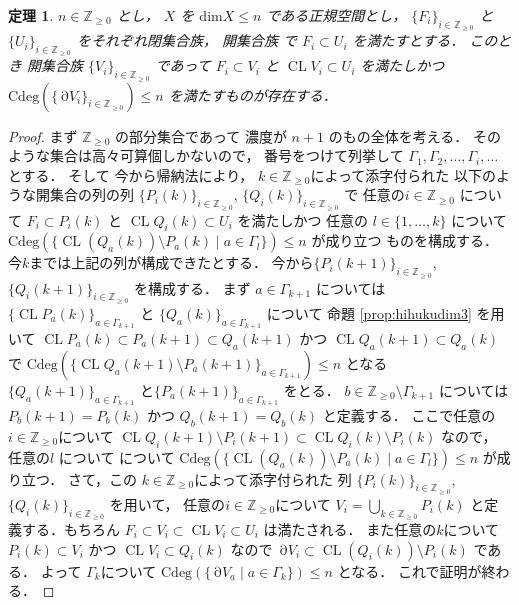 \documentclass[leqno, a4paper, 12pt]{jsarticle}
\newtheorem{thm}{定理}
\newcommand{\zz}{\mathbb{Z}}
\DeclareMathOperator{\bd}{\partial}
\DeclareMathOperator{\cl}{CL}
\newcommand{\yodim}{\mathrm{dim}}
\newcommand{\yodeg}{\mathrm{Cdeg}}
\numberwithin{equation}{section}
\begin{document}
\begin{thm}\label{thm:countablefam}
$n\in \zz_{\ge 0}$
とし，
$X$
を
$\yodim X\le n$
である正規空間とし，
$\{F_{i}\}_{i\in \zz_{\ge 0}}$
と
$\{U_{i}\}_{i\in \zz_{\ge 0}}$
をそれぞれ閉集合族，
開集合族
で
$F_{i}\subset U_{i}$
を満たすとする．
このとき
開集合族
$\{V_{i}\}_{i\in \zz_{\ge 0}}$
であって
$F_{i}\subset V_{i}$
と
$\cl V_{i}\subset U_{i}$
を満たしかつ
$\yodeg(\{\bd V_{i}\}_{i\in \zz_{\ge 0}})\le n$
を満たすものが存在する．
\end{thm}
\begin{proof}
まず
$\zz_{\ge 0}$
の部分集合であって
濃度が
$n+1$
のもの全体を考える．
そのような集合は高々可算個しかないので，
番号をつけて列挙して
$\Gamma_{1}, \Gamma_{2}, \dots, \Gamma_{i}, \dots$
とする．
そして
今から帰納法により，
$k\in \zz_{\ge 0}$によって添字付られた
以下のような開集合の列の列
$\{P_{i}(k)\}_{i\in \zz_{\ge 0}}$, 
$\{Q_{i}(k)\}_{i\in \zz_{\ge 0}}$
で
任意の$i\in \zz_{\ge 0}$
について
$F_{i}\subset P_{i}(k)$
と
$\cl Q_{i}(k)\subset U_{i}$
を満たしかつ
任意の
$l\in \{1, \dots, k\}$
について
$\yodeg(\{\cl (Q_{a}(k))\setminus P_{a}(k)\mid a\in \Gamma_{l}\})\le n$
が成り立つ
ものを構成する．
今$k$までは上記の列が構成できたとする．
今から$\{P_{i}(k+1)\}_{i\in \zz_{\ge 0}}$, 
$\{Q_{i}(k+1)\}_{i\in \zz_{\ge 0}}$
を構成する．
まず
$a\in \Gamma_{k+1}$
については
$\{\cl P_{a}(k)\}_{a\in \Gamma_{k+1}}$
と
$\{Q_{a}(k)\}_{a\in \Gamma_{k+1}}$
について
命題
\ref{prop:hihukudim3}
を用いて
$\cl P_{a}(k)\subset P_{a}(k+1)\subset Q_{a}(k+1)$
かつ
$\cl Q_{a}(k+1)\subset Q_{a}(k)$
で
$\yodeg(\{\cl Q_{a}(k+1)\setminus P_{a}(k+1)\}_{a\in \Gamma_{k+1}})\le n$
となる
$\{Q_{a}(k+1)\}_{a\in \Gamma_{k+1}}$
と$\{P_{a}(k+1)\}_{a\in \Gamma_{k+1}}$
をとる．
$b\in \zz_{\ge 0}\setminus \Gamma_{k+1}$
については
$P_{b}(k+1)=P_{b}(k)$
かつ
$Q_{b}(k+1)=Q_{b}(k)$
と定義する．
ここで任意の$i\in \zz_{\ge 0}$について
$\cl Q_{i}(k+1)\setminus P_{i}(k+1)\subset \cl Q_{i}(k)\setminus P_{i}(k)$
なので，
任意の$l$
について
について
$\yodeg(\{\cl (Q_{a}(k))\setminus P_{a}(k)\mid a\in \Gamma_{l}\})\le n$
が成り立つ．
さて，この
$k\in \zz_{\ge 0}$によって添字付られた
列
$\{P_{i}(k)\}_{i\in \zz_{\ge 0}}$, 
$\{Q_{i}(k)\}_{i\in \zz_{\ge 0}}$
を用いて，
任意の$i\in \zz_{\ge 0}$について
$V_{i}=\bigcup_{k\in \zz_{\ge 0}}P_{i}(k)$
と定義する．もちろん
$F_{i}\subset V_{i}\subset \cl V_{i}\subset U_{i}$
は満たされる．
また任意の$k$について
$P_{i}(k)\subset V_{i}$
かつ
$\cl V_{i}\subset Q_{i}(k)$
なので
$\bd V_{i}\subset \cl(Q_{i}(k))\setminus P_{i}(k)$
である．
よって
$\Gamma_{k}$について
$\yodeg(\{\bd V_{a}\mid a\in \Gamma_{k}\})\le n$
となる．
これで証明が終わる．
\end{proof}
\end{document}

